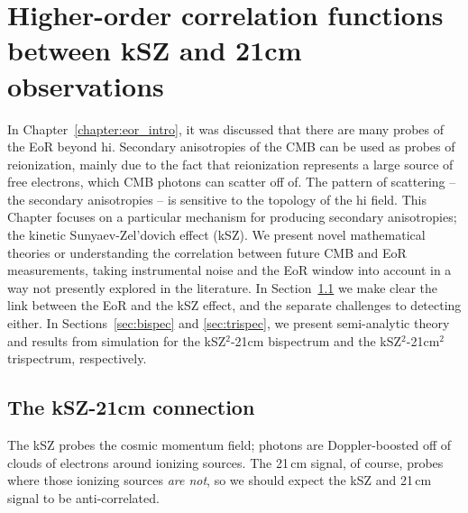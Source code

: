 \chapter{Higher-order correlation functions between kSZ and 21cm observations}
\label{chapter:ksz_21cm}

In Chapter~\ref{chapter:eor_intro}, it was discussed that there are many probes of the EoR beyond {\sc hi}. Secondary anisotropies of the CMB can be used as probes of reionization, mainly due to the fact that reionization represents a large source of free electrons, which CMB photons can scatter off of. The pattern of scattering -- the secondary anisotropies -- is sensitive to the topology of the {\sc hi} field. This Chapter focuses on a particular mechanism for producing secondary anisotropies; the kinetic Sunyaev-Zel'dovich effect (kSZ). We present novel mathematical theories or understanding the correlation between future CMB and EoR measurements, taking instrumental noise and the EoR window into account in a way not presently explored in the literature. In Section~\ref{sec:ksz-21cm} we make clear the link between the EoR and the kSZ effect, and the separate challenges to detecting either. In Sections~\ref{sec:bispec} and \ref{sec:trispec}, we present semi-analytic theory and results from simulation for the kSZ$^2$-21cm bispectrum and the kSZ$^2$-21cm$^2$ trispectrum, respectively.

\section{The kSZ-21cm connection}
\label{sec:ksz-21cm}

The kSZ probes the cosmic momentum field; photons are Doppler-boosted off of clouds of electrons around ionizing sources. The 21\,cm signal, of course, probes where those ionizing sources \textit{are not}, so we should expect the kSZ and 21\,cm signal to be anti-correlated. 

